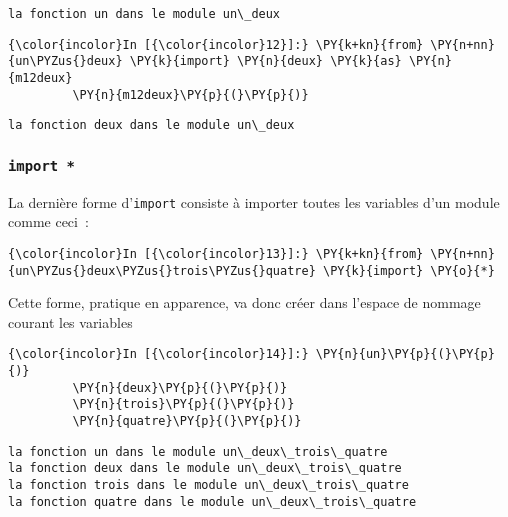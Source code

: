     \begin{Verbatim}[commandchars=\\\{\},frame=single,framerule=0.3mm,rulecolor=\color{cellframecolor}]
la fonction un dans le module un\_deux
\end{Verbatim}

    \begin{Verbatim}[commandchars=\\\{\},frame=single,framerule=0.3mm,rulecolor=\color{cellframecolor}]
{\color{incolor}In [{\color{incolor}12}]:} \PY{k+kn}{from} \PY{n+nn}{un\PYZus{}deux} \PY{k}{import} \PY{n}{deux} \PY{k}{as} \PY{n}{m12deux}
         \PY{n}{m12deux}\PY{p}{(}\PY{p}{)}
\end{Verbatim}


    \begin{Verbatim}[commandchars=\\\{\},frame=single,framerule=0.3mm,rulecolor=\color{cellframecolor}]
la fonction deux dans le module un\_deux
\end{Verbatim}

    \hypertarget{import}{%
\subsubsection{\texorpdfstring{\texttt{import\ *}}{import *}}\label{import}}

    La dernière forme d'\texttt{import} consiste à importer toutes les
variables d'un module comme ceci~:

    \begin{Verbatim}[commandchars=\\\{\},frame=single,framerule=0.3mm,rulecolor=\color{cellframecolor}]
{\color{incolor}In [{\color{incolor}13}]:} \PY{k+kn}{from} \PY{n+nn}{un\PYZus{}deux\PYZus{}trois\PYZus{}quatre} \PY{k}{import} \PY{o}{*}
\end{Verbatim}


    Cette forme, pratique en apparence, va donc créer dans l'espace de
nommage courant les variables

    \begin{Verbatim}[commandchars=\\\{\},frame=single,framerule=0.3mm,rulecolor=\color{cellframecolor}]
{\color{incolor}In [{\color{incolor}14}]:} \PY{n}{un}\PY{p}{(}\PY{p}{)}
         \PY{n}{deux}\PY{p}{(}\PY{p}{)}
         \PY{n}{trois}\PY{p}{(}\PY{p}{)}
         \PY{n}{quatre}\PY{p}{(}\PY{p}{)}
\end{Verbatim}


    \begin{Verbatim}[commandchars=\\\{\},frame=single,framerule=0.3mm,rulecolor=\color{cellframecolor}]
la fonction un dans le module un\_deux\_trois\_quatre
la fonction deux dans le module un\_deux\_trois\_quatre
la fonction trois dans le module un\_deux\_trois\_quatre
la fonction quatre dans le module un\_deux\_trois\_quatre
\end{Verbatim}

